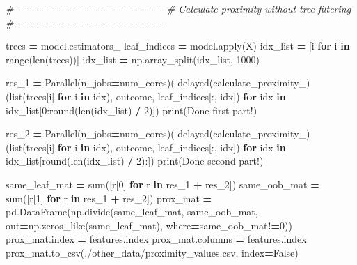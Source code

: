 \documentclass[
  11pt,
  oneside]{book}
\newenvironment{Shaded}{\begin{snugshade}}{\end{snugshade}}
\newcommand{\BuiltInTok}[1]{#1}
\newcommand{\CommentTok}[1]{\textcolor[rgb]{0.56,0.35,0.01}{\textit{#1}}}
\newcommand{\ControlFlowTok}[1]{\textcolor[rgb]{0.13,0.29,0.53}{\textbf{#1}}}
\newcommand{\DecValTok}[1]{\textcolor[rgb]{0.00,0.00,0.81}{#1}}
\newcommand{\KeywordTok}[1]{\textcolor[rgb]{0.13,0.29,0.53}{\textbf{#1}}}
\newcommand{\NormalTok}[1]{#1}
\newcommand{\OperatorTok}[1]{\textcolor[rgb]{0.81,0.36,0.00}{\textbf{#1}}}
\newcommand{\StringTok}[1]{\textcolor[rgb]{0.31,0.60,0.02}{#1}}
\newcommand{\VariableTok}[1]{\textcolor[rgb]{0.00,0.00,0.00}{#1}}
\begin{document}
\begin{Shaded}
\begin{Highlighting}[]
\CommentTok{\# {-}{-}{-}{-}{-}{-}{-}{-}{-}{-}{-}{-}{-}{-}{-}{-}{-}{-}{-}{-}{-}{-}{-}{-}{-}{-}{-}{-}{-}{-}{-}{-}{-}{-}{-}{-}{-}{-}{-}{-}{-}{-}}
\CommentTok{\# Calculate proximity without tree filtering}
\CommentTok{\# {-}{-}{-}{-}{-}{-}{-}{-}{-}{-}{-}{-}{-}{-}{-}{-}{-}{-}{-}{-}{-}{-}{-}{-}{-}{-}{-}{-}{-}{-}{-}{-}{-}{-}{-}{-}{-}{-}{-}{-}{-}{-}}

\NormalTok{trees }\OperatorTok{=}\NormalTok{ model.estimators\_}
\NormalTok{leaf\_indices }\OperatorTok{=}\NormalTok{ model.}\BuiltInTok{apply}\NormalTok{(X)}
\NormalTok{idx\_list }\OperatorTok{=}\NormalTok{ [i }\ControlFlowTok{for}\NormalTok{ i }\KeywordTok{in} \BuiltInTok{range}\NormalTok{(}\BuiltInTok{len}\NormalTok{(trees))]}
\NormalTok{idx\_list }\OperatorTok{=}\NormalTok{ np.array\_split(idx\_list, }\DecValTok{1000}\NormalTok{)}

\NormalTok{res\_1 }\OperatorTok{=}\NormalTok{ Parallel(n\_jobs}\OperatorTok{=}\NormalTok{num\_cores)(}
\NormalTok{    delayed(calculate\_proximity\_)(}\BuiltInTok{list}\NormalTok{(trees[i] }\ControlFlowTok{for}\NormalTok{ i }\KeywordTok{in}\NormalTok{ idx), outcome, leaf\_indices[:, idx]) }\ControlFlowTok{for}\NormalTok{ idx }\KeywordTok{in}\NormalTok{ idx\_list[}\DecValTok{0}\NormalTok{:}\BuiltInTok{round}\NormalTok{(}\BuiltInTok{len}\NormalTok{(idx\_list) }\OperatorTok{/} \DecValTok{2}\NormalTok{)])}
\BuiltInTok{print}\NormalTok{(}\StringTok{\textquotesingle{}Done first part!\textquotesingle{}}\NormalTok{)}

\NormalTok{res\_2 }\OperatorTok{=}\NormalTok{ Parallel(n\_jobs}\OperatorTok{=}\NormalTok{num\_cores)(}
\NormalTok{    delayed(calculate\_proximity\_)(}\BuiltInTok{list}\NormalTok{(trees[i] }\ControlFlowTok{for}\NormalTok{ i }\KeywordTok{in}\NormalTok{ idx), outcome, leaf\_indices[:, idx]) }\ControlFlowTok{for}\NormalTok{ idx }\KeywordTok{in}\NormalTok{ idx\_list[}\BuiltInTok{round}\NormalTok{(}\BuiltInTok{len}\NormalTok{(idx\_list) }\OperatorTok{/} \DecValTok{2}\NormalTok{):])}
\BuiltInTok{print}\NormalTok{(}\StringTok{\textquotesingle{}Done second part!\textquotesingle{}}\NormalTok{)}

\NormalTok{same\_leaf\_mat }\OperatorTok{=} \BuiltInTok{sum}\NormalTok{([r[}\DecValTok{0}\NormalTok{] }\ControlFlowTok{for}\NormalTok{ r }\KeywordTok{in}\NormalTok{ res\_1 }\OperatorTok{+}\NormalTok{ res\_2])}
\NormalTok{same\_oob\_mat }\OperatorTok{=} \BuiltInTok{sum}\NormalTok{([r[}\DecValTok{1}\NormalTok{] }\ControlFlowTok{for}\NormalTok{ r }\KeywordTok{in}\NormalTok{ res\_1 }\OperatorTok{+}\NormalTok{ res\_2])}
\NormalTok{prox\_mat }\OperatorTok{=}\NormalTok{ pd.DataFrame(np.divide(same\_leaf\_mat, same\_oob\_mat, out}\OperatorTok{=}\NormalTok{np.zeros\_like(same\_leaf\_mat),}
\NormalTok{                        where}\OperatorTok{=}\NormalTok{same\_oob\_mat}\OperatorTok{!=}\DecValTok{0}\NormalTok{))}
\NormalTok{prox\_mat.index }\OperatorTok{=}\NormalTok{ features.index}
\NormalTok{prox\_mat.columns }\OperatorTok{=}\NormalTok{ features.index}
\NormalTok{prox\_mat.to\_csv(}\StringTok{\textquotesingle{}./other\_data/proximity\_values.csv\textquotesingle{}}\NormalTok{, index}\OperatorTok{=}\VariableTok{False}\NormalTok{)}


\end{Highlighting}
\end{Shaded}
\end{document}
